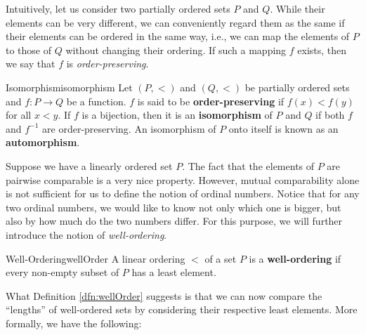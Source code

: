 \documentclass[math]{amznotes}
\theoremstyle{remark}
\begin{document}
Intuitively, let us consider two partially ordered sets $P$ and $Q$. While their elements can be very different, we can conveniently regard them as the same if their elements can be ordered in the same way, i.e., we can map the elements of $P$ to those of $Q$ without changing their ordering. If such a mapping $f$ exists, then we say that $f$ is \textit{order-preserving}.
\begin{dfnbox}{Isomorphism}{isomorphism}
    Let $(P, <)$ and $(Q, <)$ be partially ordered sets and $f \colon P \to Q$ be a function. $f$ is said to be {\color{red} \textbf{order-preserving}} if $f(x) < f(y)$ for all $x < y$. If $f$ is a bijection, then it is an {\color{red} \textbf{isomorphism}} of $P$ and $Q$ if both $f$ and $f^{-1}$ are order-preserving. An isomorphism of $P$ onto itself is known as an {\color{red} \textbf{automorphism}}.    
\end{dfnbox}
Suppose we have a linearly ordered set $P$. The fact that the elements of $P$ are pairwise comparable is a very nice property. However, mutual comparability alone is not sufficient for us to define the notion of ordinal numbers. Notice that for any two ordinal numbers, we would like to know not only which one is bigger, but also by how much do the two numbers differ. For this purpose, we will further introduce the notion of \textit{well-ordering}.
\begin{dfnbox}{Well-Ordering}{wellOrder}
    A linear ordering $<$ of a set $P$ is a {\color{red} \textbf{well-ordering}} if every non-empty subset of $P$ has a least element.
\end{dfnbox}
What Definition \ref{dfn:wellOrder} suggests is that we can now compare the ``lengths'' of well-ordered sets by considering their respective least elements. More formally, we have the following:
\end{document}
